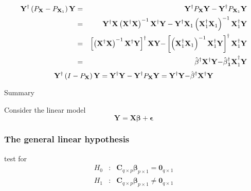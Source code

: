 \documentclass{article}
\begin{document}
\begin{eqnarray*}
\mathbf{Y}^{\dagger }\left( P_{\mathbf{X}}-P_{\mathbf{X}_{1}}\right) \mathbf{%
Y} &=&\mathbf{Y}^{\dagger }P_{\mathbf{X}}\mathbf{Y-Y}^{\dagger }P_{\mathbf{X}%
_{1}}\mathbf{Y} \\
&=&\mathbf{Y}^{\dagger }\mathbf{X}\left( \mathbf{X}^{\dagger }\mathbf{X}%
\right) ^{-1}\mathbf{X}^{\dagger }\mathbf{Y-Y}^{\dagger }\mathbf{X}%
_{1}\left( \mathbf{X}_{1}^{\dagger }\mathbf{X}_{1}\right) ^{-1}\mathbf{X}%
_{1}^{\dagger }\mathbf{Y} \\
&=&\left[ \left( \mathbf{X}^{\dagger }\mathbf{X}\right) ^{-1}\mathbf{X}%
^{\dagger }\mathbf{Y}\right] ^{\dagger }\mathbf{XY-}\left[ \left( \mathbf{X}%
_{1}^{\dagger }\mathbf{X}_{1}\right) ^{-1}\mathbf{X}_{1}^{\dagger }\mathbf{Y}%
\right] ^{\dagger }\mathbf{X}_{1}^{\dagger }\mathbf{Y} \\
&=&\hat{\beta}^{\dagger }\mathbf{X}^{\dagger }\mathbf{Y-}\hat{\beta}\mathbf{%
_{1}^{\dagger }X}_{1}^{\dagger }\mathbf{Y}
\end{eqnarray*}%
\begin{equation*}
\mathbf{Y}^{\dagger }\left( I-P_{\mathbf{X}}\right) \mathbf{Y=Y}^{\dagger }%
\mathbf{Y-Y}^{\dagger }P_{\mathbf{X}}\mathbf{Y=Y}^{\dagger }\mathbf{Y-}\hat{%
\beta}^{\dagger }\mathbf{X}^{\dagger }\mathbf{Y}
\end{equation*}

\bigskip

Summary

\bigskip

Consider the linear model%
\begin{equation*}
\mathbf{Y=X\beta +\epsilon }
\end{equation*}

\bigskip

\subsubsection{The general linear hypothesis}

\bigskip

test for%
\begin{eqnarray*}
H_{0} &:&\mathbf{C}_{q\times p}\mathbf{\beta }_{p\times 1}=\mathbf{0}%
_{q\times 1} \\
H_{1} &:&\mathbf{C}_{q\times p}\mathbf{\beta }_{p\times 1}\neq \mathbf{0}%
_{q\times 1}
\end{eqnarray*}

\bigskip
\end{document}
